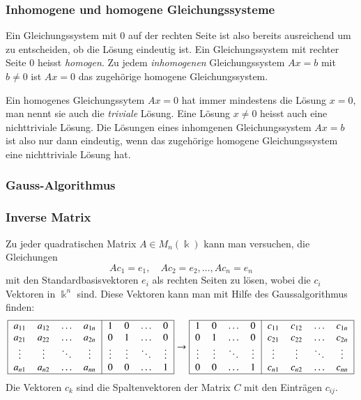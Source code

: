\subsubsection{Inhomogene und homogene Gleichungssysteme}
Ein Gleichungssystem mit $0$ auf der rechten Seite ist also bereits
ausreichend um zu entscheiden, ob die Lösung eindeutig ist.
Ein Gleichungssystem mit rechter Seite $0$ heisst {\em homogen}.
%
Zu jedem {\em inhomogenen} Gleichungssystem $Ax=b$ mit $b\ne 0$ 
ist $Ax=0$ das zugehörige homogene Gleichungssystem.

Ein homogenes Gleichungssytem $Ax=0$ hat immer mindestens die 
Lösung $x=0$, man nennt sie auch die {\em triviale} Lösung.
Eine Lösung $x\ne 0$ heisst auch eine nichttriviale Lösung.
Die Lösungen eines inhomgenen Gleichungssystem $Ax=b$ ist also nur dann
eindeutig, wenn das zugehörige homogene Gleichungssystem eine nichttriviale
Lösung hat.

\subsubsection{Gauss-Algorithmus}


\subsubsection{Inverse Matrix}
Zu jeder quadratischen Matrix $A\in M_n(\Bbbk)$ kann man versuchen, die
Gleichungen
\[
Ac_1 = e_1,\quad Ac_2 = e_2, \dots, Ac_n = e_n
\]
mit den Standardbasisvektoren $e_i$ als rechten Seiten zu lösen, wobei
die $c_i$ Vektoren in $\Bbbk^n$ sind.
Diese Vektoren kann man mit Hilfe des Gaussalgorithmus finden:
\[
\begin{tabular}{|>{$}c<{$}>{$}c<{$}>{$}c<{$}>{$}c<{$}|>{$}c<{$}>{$}c<{$}>{$}c<{$}>{$}c<{$}|}
\hline
a_{11}&a_{12}&\dots &a_{1n}&1     &0     &\dots &0     \\
a_{21}&a_{22}&\dots &a_{2n}&0     &1     &\dots &0     \\
\vdots&\vdots&\ddots&\vdots&\vdots&\vdots&\ddots&\vdots\\
a_{n1}&a_{n2}&\dots &a_{nn}&0     &0     &\dots &1     \\
\hline
\end{tabular}
\rightarrow
\begin{tabular}{|>{$}c<{$}>{$}c<{$}>{$}c<{$}>{$}c<{$}|>{$}c<{$}>{$}c<{$}>{$}c<{$}>{$}c<{$}|}
\hline
1     &0     &\dots &0     &c_{11}&c_{12}&\dots &c_{1n}\\
0     &1     &\dots &0     &c_{21}&c_{22}&\dots &c_{2n}\\
\vdots&\vdots&\ddots&\vdots&\vdots&\vdots&\ddots&\vdots\\
0     &0     &\dots &1     &c_{n1}&c_{n2}&\dots &c_{nn}\\
\hline
\end{tabular}
\]
Die Vektoren $c_k$ sind die Spaltenvektoren der Matrix $C$ mit den
Einträgen $c_{ij}$.

